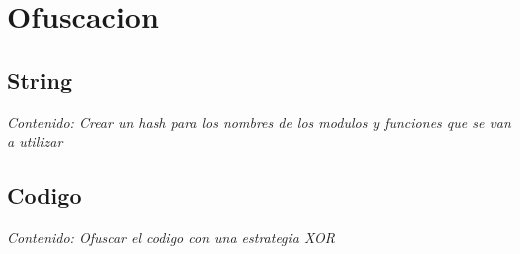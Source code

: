 \section{Ofuscacion}

\subsection{String}

\textit{Contenido: Crear un hash para los nombres de los modulos y 
funciones que se van a utilizar }
\vspace{1em}

\subsection{Codigo}

\textit{Contenido: Ofuscar el codigo con una estrategia XOR}
\vspace{1em}
